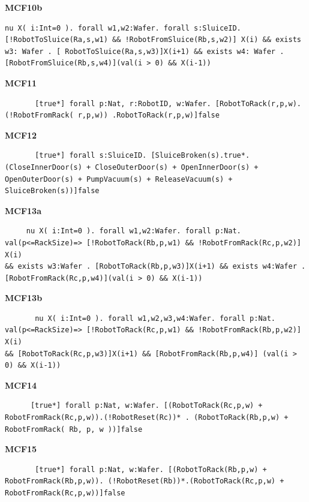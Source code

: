 \documentclass[12pt]{report}
\begin{document}
    \textbf{MCF10b}
    \begin{lstlisting}
nu X( i:Int=0 ). forall w1,w2:Wafer. forall s:SluiceID. [!RobotToSluice(Ra,s,w1) && !RobotFromSluice(Rb,s,w2)] X(i) && exists w3: Wafer . [ RobotToSluice(Ra,s,w3)]X(i+1) && exists w4: Wafer .[RobotFromSluice(Rb,s,w4)](val(i > 0) && X(i-1))
    \end{lstlisting}

    \textbf{MCF11}
    \begin{lstlisting}
       [true*] forall p:Nat, r:RobotID, w:Wafer. [RobotToRack(r,p,w).(!RobotFromRack( r,p,w)) .RobotToRack(r,p,w)]false
    \end{lstlisting}

    \textbf{MCF12}
    \begin{lstlisting}
       [true*] forall s:SluiceID. [SluiceBroken(s).true*.(CloseInnerDoor(s) + CloseOuterDoor(s) + OpenInnerDoor(s) + OpenOuterDoor(s) + PumpVacuum(s) + ReleaseVacuum(s) + SluiceBroken(s))]false
    \end{lstlisting}

    \textbf{MCF13a}
    \begin{lstlisting}
     nu X( i:Int=0 ). forall w1,w2:Wafer. forall p:Nat. val(p<=RackSize)=> [!RobotToRack(Rb,p,w1) && !RobotFromRack(Rc,p,w2)] X(i) 
&& exists w3:Wafer . [RobotToRack(Rb,p,w3)]X(i+1) && exists w4:Wafer . [RobotFromRack(Rc,p,w4)](val(i > 0) && X(i-1))
    \end{lstlisting}

    \textbf{MCF13b}
    \begin{lstlisting}
       nu X( i:Int=0 ). forall w1,w2,w3,w4:Wafer. forall p:Nat. val(p<=RackSize)=> [!RobotToRack(Rc,p,w1) && !RobotFromRack(Rb,p,w2)] X(i) 
&& [RobotToRack(Rc,p,w3)]X(i+1) && [RobotFromRack(Rb,p,w4)] (val(i > 0) && X(i-1))
   \end{lstlisting}

    \textbf{MCF14}
    \begin{lstlisting}
      [true*] forall p:Nat, w:Wafer. [(RobotToRack(Rc,p,w) + RobotFromRack(Rc,p,w)).(!RobotReset(Rc))* . (RobotToRack(Rb,p,w) + RobotFromRack( Rb, p, w ))]false
    \end{lstlisting}

    \textbf{MCF15}
    \begin{lstlisting}
       [true*] forall p:Nat, w:Wafer. [(RobotToRack(Rb,p,w) + RobotFromRack(Rb,p,w)). (!RobotReset(Rb))*.(RobotToRack(Rc,p,w) + RobotFromRack(Rc,p,w))]false
    \end{lstlisting}
\end{document}
